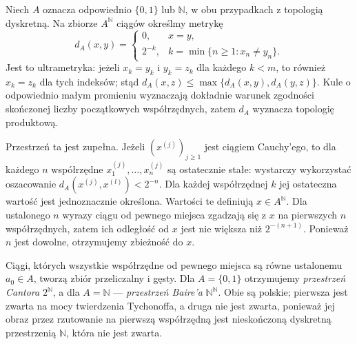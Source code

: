 \begin{przyklad}
\label{ex:topog-polskie-cantor-baire}
Niech $A$ oznacza odpowiednio
$\{0,1\}$ lub $\mathbb N$,
w obu przypadkach z topologią dyskretną.
Na zbiorze $A^{\mathbb N}$ ciągów
określmy metrykę
\[
d_A(x,y)=
\begin{cases}
0,&x=y,\\
2^{-k},&k=\min\{n\ge1:x_n\ne y_n\}.
\end{cases}
\]
Jest to ultrametryka: jeżeli
$x_k=y_k$ i $y_k=z_k$
dla każdego $k<m$, to również
$x_k=z_k$ dla tych indeksów;
stąd
$d_A(x,z)\le\max\{d_A(x,y),d_A(y,z)\}$.
Kule o odpowiednio małym promieniu
wyznaczają dokładnie warunek
zgodności skończonej liczby
początkowych współrzędnych,
zatem $d_A$ wyznacza topologię
produktową.

Przestrzeń ta jest zupełna.
Jeżeli $(x^{(j)})_{j\ge1}$ jest
ciągiem Cauchy'ego, to dla każdego
$n$ współrzędne
$x_1^{(j)},\ldots,x_n^{(j)}$
są ostatecznie stałe:
wystarczy wykorzystać oszacowanie
$d_A(x^{(j)},x^{(l)})<2^{-n}$.
Dla każdej współrzędnej $k$
jej ostateczna wartość jest
jednoznacznie określona.
Wartości te definiują
$x\in A^{\mathbb N}$.
Dla ustalonego $n$ wyrazy
ciągu od pewnego miejsca
zgadzają się z $x$
na pierwszych $n$ współrzędnych,
zatem ich odległość od $x$
jest nie większa niż
$2^{-(n+1)}$.
Ponieważ $n$ jest dowolne,
otrzymujemy zbieżność do $x$.

Ciągi, których wszystkie współrzędne
od pewnego miejsca są równe
ustalonemu $a_0\in A$,
tworzą zbiór przeliczalny i gęsty.
Dla $A=\{0,1\}$ otrzymujemy
\emph{przestrzeń Cantora}
$2^{\mathbb N}$, a dla
$A=\mathbb N$ ---
\emph{przestrzeń Baire'a}
$\mathbb N^{\mathbb N}$.
Obie są polskie; pierwsza jest
zwarta na mocy twierdzenia Tychonoffa,
a druga nie jest zwarta, ponieważ
jej obraz przez rzutowanie na
pierwszą współrzędną jest
nieskończoną dyskretną przestrzenią
$\mathbb N$, która nie jest zwarta.
\end{przyklad}

